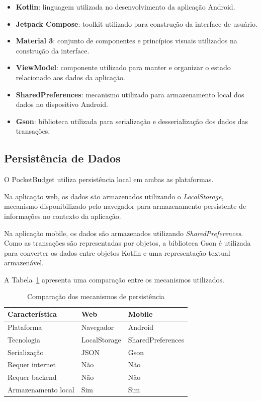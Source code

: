 \documentclass[12pt,a4paper]{article}
\begin{document}
\begin{itemize}
    \item \textbf{Kotlin}: linguagem utilizada no desenvolvimento da aplicação Android.
    
    \item \textbf{Jetpack Compose}: toolkit utilizado para construção da interface de usuário.
    
    \item \textbf{Material 3}: conjunto de componentes e princípios visuais utilizados na construção da interface.
    
    \item \textbf{ViewModel}: componente utilizado para manter e organizar o estado relacionado aos dados da aplicação.
    
    \item \textbf{SharedPreferences}: mecanismo utilizado para armazenamento local dos dados no dispositivo Android.
    
    \item \textbf{Gson}: biblioteca utilizada para serialização e desserialização dos dados das transações.
\end{itemize}

\subsection{Persistência de Dados}

O PocketBudget utiliza persistência local em ambas as plataformas.

Na aplicação web, os dados são armazenados utilizando o \textit{LocalStorage}, mecanismo disponibilizado pelo navegador para armazenamento persistente de informações no contexto da aplicação.

Na aplicação mobile, os dados são armazenados utilizando \textit{SharedPreferences}. Como as transações são representadas por objetos, a biblioteca Gson é utilizada para converter os dados entre objetos Kotlin e uma representação textual armazenável.

A Tabela~\ref{tab:storage-comparison} apresenta uma comparação entre os mecanismos utilizados.

\begin{table}[H]
    \centering
    \caption{Comparação dos mecanismos de persistência}
    \label{tab:storage-comparison}
    \begin{tabular}{lll}
        \toprule
        \textbf{Característica} & \textbf{Web} & \textbf{Mobile} \\
        \midrule
        Plataforma & Navegador & Android \\
        Tecnologia & LocalStorage & SharedPreferences \\
        Serialização & JSON & Gson \\
        Requer internet & Não & Não \\
        Requer backend & Não & Não \\
        Armazenamento local & Sim & Sim \\
        \bottomrule
    \end{tabular}
\end{table}
\end{document}
